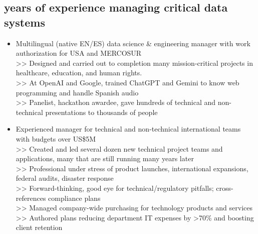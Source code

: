 \subsection{\number\numexpr{}\relax\space years of experience managing critical data systems}
\vspace{\topsep}
    \begin{itemize}
        \item Multilingual (native EN/ES) data science \& engineering manager with work authorization for USA and MERCOSUR
        \\ >> Designed and carried out to completion many mission-critical projects in healthcare, education, and human rights.
        \\ >> At OpenAI and Google, trained ChatGPT and Gemini to know web programming and handle Spanish audio
        \\ >> Panelist, hackathon awardee, gave hundreds of technical and non-technical presentations to thousands of people
        
        \item Experienced manager for technical and non-technical international teams with budgets over US\$5M
        \\ >> Created and led several dozen new technical project teams and applications, many that are still running many years later
        \\ >> Professional under stress of product launches, international expansions, federal audits, disaster response
        \\ >> Forward-thinking, good eye for technical/regulatory pitfalls; cross-references compliance plans
        \\ >> Managed company-wide purchasing for technology products and services
        \\ >> Authored plans reducing department IT expenses by >70\% and boosting client retention
        

\end{itemize}
